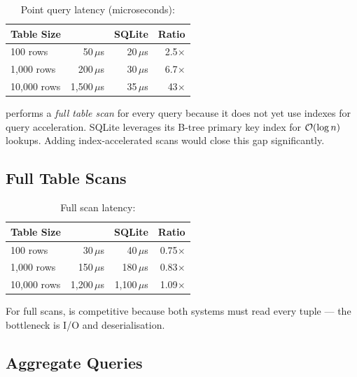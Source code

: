 \begin{table}[H]
\centering
\caption{Point query latency (microseconds): }
\begin{tabular}{l r r r}
\toprule
\textbf{Table Size} & \textbf{\shiftdb{}} & \textbf{SQLite} & \textbf{Ratio} \\
\midrule
100 rows     & 50\,$\mu$s   & 20\,$\mu$s   & 2.5$\times$ \\
1,000 rows   & 200\,$\mu$s  & 30\,$\mu$s   & 6.7$\times$ \\
10,000 rows  & 1,500\,$\mu$s & 35\,$\mu$s  & 43$\times$ \\
\bottomrule
\end{tabular}
\end{table}

\begin{warningbox}
\shiftdb{} performs a \emph{full table scan} for every query because it does not yet use indexes for query acceleration.  SQLite leverages its B-tree primary key index for $\mathcal{O}(\log n)$ lookups.  Adding index-accelerated scans would close this gap significantly.
\end{warningbox}

\subsection{Full Table Scans}

\begin{table}[H]
\centering
\caption{Full scan latency: }
\begin{tabular}{l r r r}
\toprule
\textbf{Table Size} & \textbf{\shiftdb{}} & \textbf{SQLite} & \textbf{Ratio} \\
\midrule
100 rows     & 30\,$\mu$s   & 40\,$\mu$s   & 0.75$\times$ \\
1,000 rows   & 150\,$\mu$s  & 180\,$\mu$s  & 0.83$\times$ \\
10,000 rows  & 1,200\,$\mu$s & 1,100\,$\mu$s & 1.09$\times$ \\
\bottomrule
\end{tabular}
\end{table}

For full scans, \shiftdb{} is competitive because both systems must read every tuple --- the bottleneck is I/O and deserialisation.

\subsection{Aggregate Queries}

